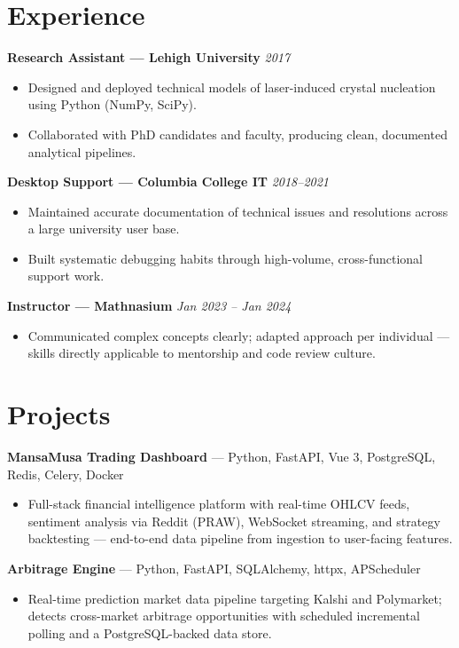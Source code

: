 \documentclass[10pt]{article}
\begin{document}
\section{Experience}

\textbf{Research Assistant --- Lehigh University} \hfill \textit{2017} 
\begin{itemize}
  \item Designed and deployed technical models of laser-induced crystal nucleation using Python (NumPy, SciPy).
  \item Collaborated with PhD candidates and faculty, producing clean, documented analytical pipelines.
\end{itemize}

\textbf{Desktop Support --- Columbia College IT} \hfill \textit{2018--2021} 
\begin{itemize}
  \item Maintained accurate documentation of technical issues and resolutions across a large university user base.
  \item Built systematic debugging habits through high-volume, cross-functional support work.
\end{itemize}

\textbf{Instructor --- Mathnasium} \hfill \textit{Jan 2023 -- Jan 2024} 
\begin{itemize}
  \item Communicated complex concepts clearly; adapted approach per individual --- skills directly applicable to mentorship and code review culture.
\end{itemize}

\section{Projects}

\textbf{MansaMusa Trading Dashboard} --- Python, FastAPI, Vue 3, PostgreSQL, Redis, Celery, Docker 
\begin{itemize}
  \item Full-stack financial intelligence platform with real-time OHLCV feeds, sentiment analysis via Reddit (PRAW), WebSocket streaming, and strategy backtesting --- end-to-end data pipeline from ingestion to user-facing features.
\end{itemize}

\textbf{Arbitrage Engine} --- Python, FastAPI, SQLAlchemy, httpx, APScheduler 
\begin{itemize}
  \item Real-time prediction market data pipeline targeting Kalshi and Polymarket; detects cross-market arbitrage opportunities with scheduled incremental polling and a PostgreSQL-backed data store.
\end{itemize}
\end{document}
